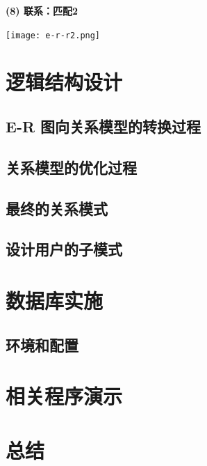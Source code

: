 \documentclass[12pt]{article}
\begin{document}
\noindent \textbf{(8) 联系：匹配2}

\begin{center}
	\texttt{[image: e-r-r2.png]}
\end{center}

\section{逻辑结构设计}

\subsection{E-R 图向关系模型的转换过程}

\subsection{关系模型的优化过程}

\subsection{最终的关系模式}

\subsection{设计用户的子模式}

\section{数据库实施}

\subsection{环境和配置}

\section{相关程序演示}
\section{总结}
\end{document}
